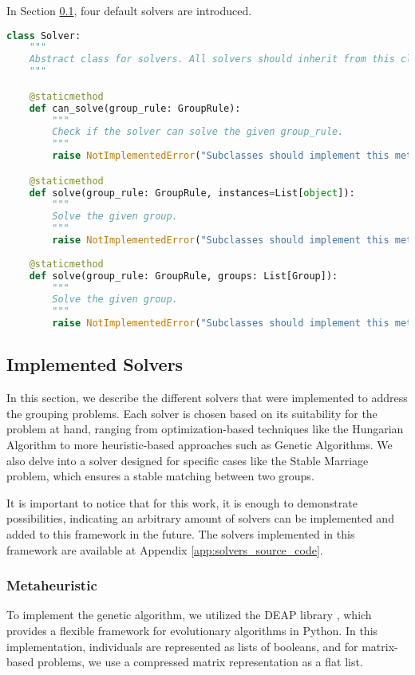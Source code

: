             In Section \ref{sec:implemented_solvers}, four default solvers are introduced.

\begin{lstlisting}[language=Python, caption={Solver Class.}, label={script:solver}]
class Solver:
    """
    Abstract class for solvers. All solvers should inherit from this class.
    """

    @staticmethod
    def can_solve(group_rule: GroupRule):
        """
        Check if the solver can solve the given group_rule.
        """
        raise NotImplementedError("Subclasses should implement this method.")

    @staticmethod
    def solve(group_rule: GroupRule, instances=List[object]):
        """
        Solve the given group.
        """
        raise NotImplementedError("Subclasses should implement this method.")
    
    @staticmethod
    def solve(group_rule: GroupRule, groups: List[Group]):
        """
        Solve the given group.
        """
        raise NotImplementedError("Subclasses should implement this method.")
    \end{lstlisting}

    \subsection{Implemented Solvers}
    \label{sec:implemented_solvers}
    In this section, we describe the different solvers that were implemented to address the grouping problems. Each solver is chosen based on its suitability for the problem at hand, ranging from optimization-based techniques like the Hungarian Algorithm to more heuristic-based approaches such as Genetic Algorithms. We also delve into a solver designed for specific cases like the Stable Marriage problem, which ensures a stable matching between two groups.

    It is important to notice that for this work, it is enough to demonstrate possibilities, indicating an arbitrary amount of solvers can be implemented and added to this framework in the future.
    The solvers implemented in this framework are available at Appendix \ref{app:solvers_source_code}.

    \subsubsection{Metaheuristic}
        To implement the genetic algorithm, we utilized the DEAP library \cite{deap}, which provides a flexible framework for evolutionary algorithms in Python.
        In this implementation, individuals are represented as lists of booleans, and for matrix-based problems, we use a compressed matrix representation as a flat list.

